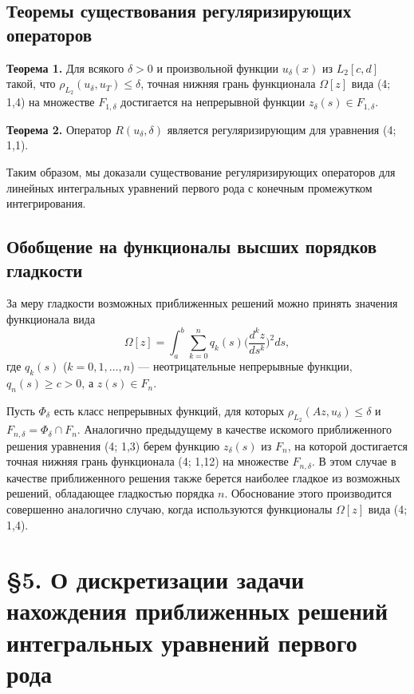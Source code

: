 \documentclass[a4paper,14pt]{extarticle}
\begin{document}
\subsection{Теоремы существования регуляризирующих операторов}

\textbf{Теорема 1.} Для всякого \(\delta > 0\) и произвольной функции \(u_\delta(x)\) из \(L_2[c,d]\) такой, что \(\rho_{L_2}(u_\delta, u_T) \le \delta\), точная нижняя грань функционала \(\Omega[z]\) вида (4; 1,4) на множестве \(F_{1,\delta}\) достигается на непрерывной функции \(z_\delta(s) \in F_{1,\delta}\).

\textbf{Теорема 2.} Оператор \(R(u_\delta, \delta)\) является регуляризирующим для уравнения (4; 1,1).

Таким образом, мы доказали существование регуляризирующих операторов для линейных интегральных уравнений первого рода с конечным промежутком интегрирования.

\subsection{Обобщение на функционалы высших порядков гладкости}

За меру гладкости возможных приближенных решений можно принять значения функционала вида
\begin{equation}
\Omega[z] = \int_a^b \sum_{k=0}^n q_k(s) \bigl(\frac{d^k z}{d s^k}\bigr)^2 ds, \tag{4; 1,12}
\end{equation}
где \(q_k(s)\) (\(k = 0,1,\dots,n\)) — неотрицательные непрерывные функции, \(q_n(s) \ge c > 0\), а \(z(s) \in F_n\).

Пусть \(\Phi_\delta\) есть класс непрерывных функций, для которых \(\rho_{L_2}(Az, u_\delta) \le \delta\) и \(F_{n,\delta} = \Phi_\delta \cap F_n\). Аналогично предыдущему в качестве искомого приближенного решения уравнения (4; 1,3) берем функцию \(z_\delta(s)\) из \(F_{n}\), на которой достигается точная нижняя грань функционала (4; 1,12) на множестве \(F_{n,\delta}\). В этом случае в качестве приближенного решения также берется наиболее гладкое из возможных решений, обладающее гладкостью порядка \(n\). Обоснование этого производится совершенно аналогично случаю, когда используются функционалы \(\Omega[z]\) вида (4; 1,4).


\section{\S 5. О дискретизации задачи нахождения приближенных решений интегральных уравнений первого рода}
\end{document}
